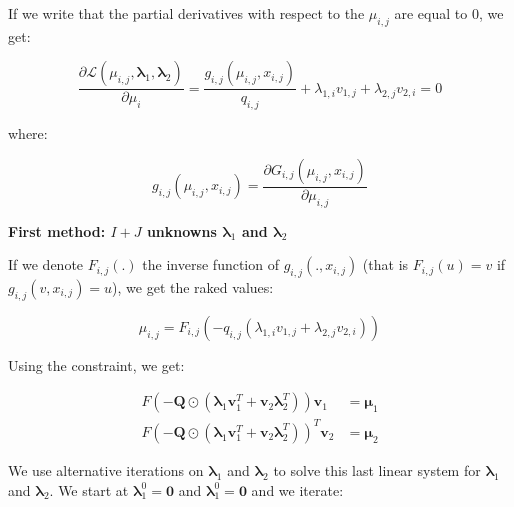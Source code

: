 \documentclass{tex/note}
\begin{document}
If we write that the partial derivatives with respect to the $\mu_{i,j}$ are equal to $0$, we get:

\begin{equation*}
\frac{\partial \mathcal{L} \left( \mu_{i,j} , \bm{\lambda}_1 , \bm{\lambda}_2 \right)}{\partial \mu_i} = \frac{g_{i,j} \left( \mu_{i,j} , x_{i,j} \right)}{q_{i,j}} + \lambda_{1,i} v_{1,j} + \lambda_{2,j} v_{2,i} = 0
\end{equation*}

where:

\begin{equation*}
g_{i,j} \left( \mu_{i,j} , x_{i,j} \right) = \frac{\partial G_{i,j} \left( \mu_{i,j} , x_{i,j} \right)}{\partial \mu_{i,j}}
\end{equation*}

\textbf{First method: $I + J$ unknowns $\bm{\lambda}_1$ and $\bm{\lambda}_2$}

If we denote $F_{i,j} \left( . \right)$ the inverse function of $g_{i,j} \left( . , x_{i,j} \right)$ (that is $F_{i,j} \left( u \right) = v$ if $g_{i,j} \left( v , x_{i,j} \right) = u$), we get the raked values:

\begin{equation*}
\mu_{i,j} = F_{i,j} \left( - q_{i,j} \left( \lambda_{1,i} v_{1,j} + \lambda_{2,j} v_{2,i} \right) \right)
\end{equation*}

Using the constraint, we get:

\begin{align*}
F \left( - \bm{Q} \odot \left( \bm{\lambda}_1 \bm{v}_1^T + \bm{v}_2 \bm{\lambda}_2^T \right) \right) \bm{v}_1 &= \bm{\mu}_1 \\
F \left( - \bm{Q} \odot \left( \bm{\lambda}_1 \bm{v}_1^T + \bm{v}_2 \bm{\lambda}_2^T \right) \right)^T \bm{v}_2 &= \bm{\mu}_2
\end{align*}

We use alternative iterations on $\bm{\lambda}_1$ and $\bm{\lambda}_2$ to solve this last linear system for $\bm{\lambda}_1$ and $\bm{\lambda}_2$. We start at $\bm{\lambda}_1^0 = \bm{0}$ and $\bm{\lambda}_1^0 = \bm{0}$ and we iterate:
\end{document}
